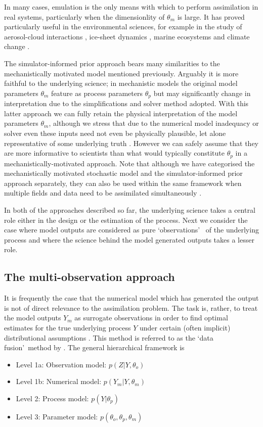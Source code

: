 \documentclass[10pt,a4paper]{article}
\begin{document}
In many cases, emulation is the only means with which to perform assimilation in real systems, particularly when the dimensionlity of $\theta_m$ is large. It has proved particularly useful in the environmental sciences, for example in the study of aerosol-cloud interactions \citep{Lee_2013}, ice-sheet dynamics \citep{Gladstone_2012, McNeall_2013}, marine ecosystems \citep{Leeds_2013} and climate change \citep{Holden_2013}.


The simulator-informed prior approach bears many similarities to the mechanistically motivated model mentioned previously. Arguably it is more faithful to the underlying science; in mechanistic models the original model parameters $\theta_m$ feature as process parameters $\theta_p$ but may significantly change in interpretation due to the simplifications and solver method adopted. With this latter approach we can fully retain the physical interpretation of the model parameters $\theta_m$, although we stress that due to the numerical model inadequacy or solver even these inputs need not even be physically plausible, let alone representative of some underlying truth \citep{Kennedy_2001}. However we can safely assume that they are more informative to scientists than what would typically constitute $\theta_p$ in a mechanistically-motivated approach. Note that although we have categorised the mechanistically motivated stochastic model and the simulator-informed prior approach separately, they can also be used within the same framework when multiple fields and data need to be assimilated simultaneously \citep{Pagendam_2014}. 

In both of the approaches described so far, the underlying science takes a central role either in the design or the estimation of the process. Next we consider the case where model outputs are considered as pure \lq observations\rq~ of the underlying process and where the science behind the model generated outputs takes a lesser role.

\subsection{The multi-observation approach}\label{sec:mo}

It is frequently the case that the numerical model which has generated the output is not of direct relevance to the assimilation problem. The task is, rather, to treat the model outputs $Y_m$ as surrogate observations in order to find optimal estimates for the true underlying process $Y$ under certain (often implicit) distributional assumptions \citep{Berliner_2012}. This method is referred to as the \lq data fusion\rq~method by \cite{Gelfand_2009}. The general hierarchical framework is
\begin{itemize}
\item Level 1a: Observation model: $p(Z | Y, \theta_o)$
\item Level 1b: Numerical model: $p(Y_m | Y, \theta_m)$
\item Level 2: Process model: $p(Y | \theta_p)$
\item Level 3: Parameter model: $p(\theta_o, \theta_p, \theta_m)$
\end{itemize}
\end{document}
